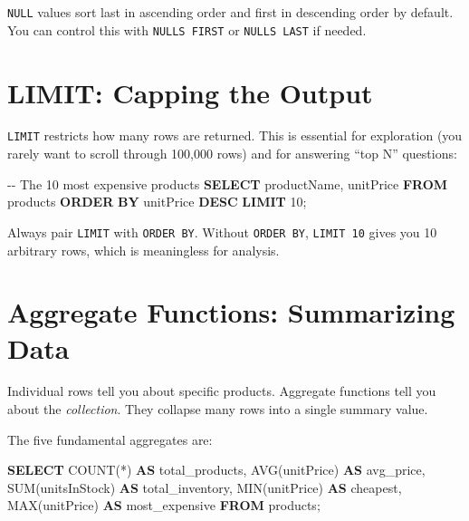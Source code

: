 \documentclass[
  letterpaper,
  DIV=11,
  numbers=noendperiod]{scrreprt}
\newenvironment{Shaded}{\begin{snugshade}}{\end{snugshade}}
\newcommand{\CommentTok}[1]{\textcolor[rgb]{0.37,0.37,0.37}{#1}}
\newcommand{\DecValTok}[1]{\textcolor[rgb]{0.68,0.00,0.00}{#1}}
\newcommand{\FunctionTok}[1]{\textcolor[rgb]{0.28,0.35,0.67}{#1}}
\newcommand{\KeywordTok}[1]{\textcolor[rgb]{0.00,0.23,0.31}{\textbf{#1}}}
\newcommand{\NormalTok}[1]{\textcolor[rgb]{0.00,0.23,0.31}{#1}}
\newcommand{\OperatorTok}[1]{\textcolor[rgb]{0.37,0.37,0.37}{#1}}
\begin{document}
\texttt{NULL} values sort last in ascending order and first in
descending order by default. You can control this with
\texttt{NULLS\ FIRST} or \texttt{NULLS\ LAST} if needed.

\section{LIMIT: Capping the Output}\label{limit-capping-the-output}

\texttt{LIMIT} restricts how many rows are returned. This is essential
for exploration (you rarely want to scroll through 100,000 rows) and for
answering ``top N'' questions:

\begin{codelisting}

\caption{\texttt{duckdb}}

\begin{Shaded}
\begin{Highlighting}[]
\CommentTok{{-}{-} The 10 most expensive products}
\KeywordTok{SELECT}
\NormalTok{    productName,}
\NormalTok{    unitPrice}
\KeywordTok{FROM}\NormalTok{ products}
\KeywordTok{ORDER} \KeywordTok{BY}\NormalTok{ unitPrice }\KeywordTok{DESC}
\KeywordTok{LIMIT} \DecValTok{10}\NormalTok{;}
\end{Highlighting}
\end{Shaded}

\end{codelisting}

Always pair \texttt{LIMIT} with \texttt{ORDER\ BY}. Without
\texttt{ORDER\ BY}, \texttt{LIMIT\ 10} gives you 10 arbitrary rows,
which is meaningless for analysis.

\section{Aggregate Functions: Summarizing
Data}\label{aggregate-functions-summarizing-data}

Individual rows tell you about specific products. Aggregate functions
tell you about the \emph{collection}. They collapse many rows into a
single summary value.

The five fundamental aggregates are:

\begin{codelisting}

\caption{\texttt{duckdb}}

\begin{Shaded}
\begin{Highlighting}[]
\KeywordTok{SELECT}
    \FunctionTok{COUNT}\NormalTok{(}\OperatorTok{*}\NormalTok{) }\KeywordTok{AS}\NormalTok{ total\_products,}
    \FunctionTok{AVG}\NormalTok{(unitPrice) }\KeywordTok{AS}\NormalTok{ avg\_price,}
    \FunctionTok{SUM}\NormalTok{(unitsInStock) }\KeywordTok{AS}\NormalTok{ total\_inventory,}
    \FunctionTok{MIN}\NormalTok{(unitPrice) }\KeywordTok{AS}\NormalTok{ cheapest,}
    \FunctionTok{MAX}\NormalTok{(unitPrice) }\KeywordTok{AS}\NormalTok{ most\_expensive}
\KeywordTok{FROM}\NormalTok{ products;}
\end{Highlighting}
\end{Shaded}

\end{codelisting}
\end{document}
